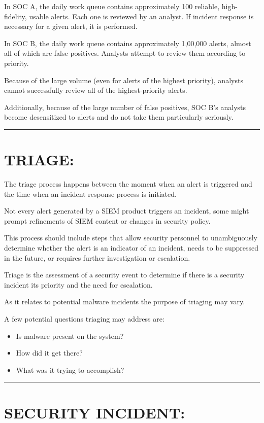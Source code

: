 \documentclass[10pt,british,english]{article}
\begin{document}
In SOC A, the daily work queue contains approximately 100 reliable,
high-fidelity, usable alerts. Each one is reviewed by an analyst.
If incident response is necessary for a given alert, it is performed.

In SOC B, the daily work queue contains approximately 1,00,000 alerts,
almost all of which are false positives. Analysts attempt to review
them according to priority. 

Because of the large volume (even for alerts of the highest priority),
analysts cannot successfully review all of the highest-priority alerts. 

Additionally, because of the large number of false positives, SOC
B's analysts become desensitized to alerts and do not take them particularly
seriously.

\rule[0.5ex]{1\columnwidth}{1pt}

\section{TRIAGE:}

The triage process happens between the moment when an alert is triggered
and the time when an incident response process is initiated. 

Not every alert generated by a SIEM product triggers an incident,
some might prompt refinements of SIEM content or changes in security
policy. 

This process should include steps that allow security personnel to
unambiguously determine whether the alert is an indicator of an incident,
needs to be suppressed in the future, or requires further investigation
or escalation.

Triage is the assessment of a security event to determine if there
is a security incident its priority and the need for escalation.

As it relates to potential malware incidents the purpose of triaging
may vary. 

A few potential questions triaging may address are:
\begin{itemize}
\item Is malware present on the system?
\item How did it get there?
\item What was it trying to accomplish?
\end{itemize}
\rule[0.5ex]{1\columnwidth}{1pt}

\section{SECURITY INCIDENT:}
\end{document}
